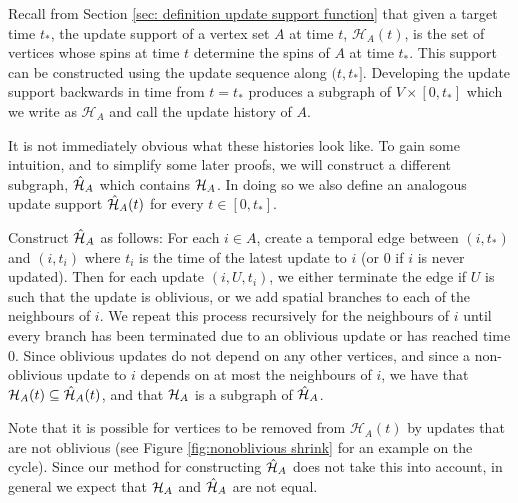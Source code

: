 Recall from Section \ref{sec: definition update support function} that given a target time $t_*$, the update support of a vertex set $A$ at time $t$, $\mathcal{H}_A(t)$, is the set of vertices whose spins at time $t$ determine the spins of $A$ at time $t_*$. This support can be constructed using the update sequence along $(t, t_*]$. Developing the update support backwards in time from $t = t_*$ produces a subgraph of $V \times [0, t_*]$ which we write as $\mathcal{H}_A$ and call the update history of $A$.

It is not immediately obvious what these histories look like. To gain some intuition, and to simplify some later proofs, we will construct a different subgraph, $\hat{\mathcal{H}}_A$ which contains $\mathcal{H}_A$. In doing so we also define an analogous update support $\hat{\mathcal{H}}_A(t)$ for every $t \in [0, t_*]$. 

Construct $\hat{\mathcal{H}}_A$ as follows: For each $i \in A$, create a temporal edge between $(i, t_*)$ and $(i, t_i)$ where $t_i$ is the time of the latest update to $i$ (or $0$ if $i$ is never updated). Then for each update $(i, U, t_i)$, we either terminate the edge if $U$ is such that the update is oblivious, or we add spatial branches to each of the neighbours of $i$. We repeat this process recursively for the neighbours of $i$ until every branch has been terminated due to an oblivious update or has reached time $0$. Since oblivious updates do not depend on any other vertices, and since a non-oblivious update to $i$ depends on at most the neighbours of $i$, we have that $\mathcal{H}_A(t) \subseteq \hat{\mathcal{H}}_A(t)$, and that $\mathcal{H}_A$ is a subgraph of $\hat{\mathcal{H}}_A$.

Note that it is possible for vertices to be removed from $\mathcal{H}_A(t)$ by updates that are not oblivious (see Figure \ref{fig:nonoblivious shrink} for an example on the cycle). Since our method for constructing $\hat{\mathcal{H}}_A$ does not take this into account, in general we expect that $\mathcal{H}_A$ and $\hat{\mathcal{H}}_A$ are not equal.


